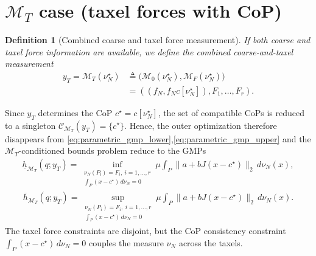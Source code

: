 \documentclass[11pt,a4paper]{article}
\theoremstyle{proposition}
\newtheorem{definition}[theorem]{Definition}
\begin{document}
\section{$\mathcal{M}_T$ case (taxel forces with CoP)}
\label{sec:MT}

\begin{definition}[Combined coarse and taxel force measurement]
If both coarse and taxel force information are available, we define the \textit{combined coarse-and-taxel measurement}
\begin{align}
    y_T=\mathcal M_T(\nu_N^\star)
    &\triangleq
    \bigl(
    \mathcal M_0(\nu_N^\star),
    \mathcal M_F(\nu_N^\star)
    \bigr) \\
    &= \left(
    (f_N,f_Nc[\nu_N^\star]), F_1,\ldots,F_r\right).
\end{align}
\end{definition}
Since $y_T$ determines the CoP $c^\star=c[\nu_N^\star]$, the set of compatible CoPs is reduced to a singleton $\mathcal C_{\mathcal M_T}(y_T)=\{c^\star\}$. Hence, the outer optimization therefore disappears from \eqref{eq:parametric_gmp_lower},\eqref{eq:parametric_gmp_upper} and the $\mathcal M_T$-conditioned bounds problem reduce to the GMPs 
    \begin{align}
    \underline h_{\mathcal M_T}(q;y_T)
    =
    \inf_{\substack{
    \nu_N(P_i)=F_i,\ i=1,\ldots,r\\
    \int_P(x-c^\star)\,d\nu_N=0}}
    \mu\int_P
    \|a+bJ(x-c^\star)\|_2\,d\nu_N(x),
\end{align}
\begin{align}
    \overline h_{\mathcal M_T}(q;y_T)
    =
    \sup_{\substack{
    \nu_N(P_i)=F_i,\ i=1,\ldots,r\\
    \int_P(x-c^\star)\,d\nu_N=0}}
    \mu\int_P
    \|a+bJ(x-c^\star)\|_2\,d\nu_N(x).
\end{align}
The taxel force constraints are disjoint, but the CoP consistency constraint $\int_P(x-c^\star)\,d\nu_N=0$ couples the measure $\nu_N$ across the taxels.
\end{document}
